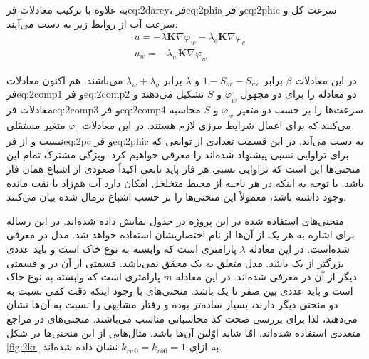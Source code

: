 به علاوه با ترکیب معادلات ‌فر{eq:2darcy}، ‌فر{eq:2phia} و ‌فر{eq:2phic} سرعت کل و سرعت آب از روابط زیر به دست می‌آیند:
\begin{align}
	\label{eq:2comp3}
&u = - \lambda\textbf{K}\nabla\varphi_w - \lambda_o\textbf{K}\nabla\varphi_c \\
	\label{eq:2comp4}
&u_w =- \lambda_w\textbf{K}\nabla\varphi_w 
\end{align}

در این معادلات $\beta$ برابر $1-S_{or}-S_{wc}$ و $\lambda$ برابر $\lambda_w +\lambda_o$ می‌باشند. هم اکنون معادلات ‌فر{eq:2comp1} و ‌فر{eq:2comp2} دو معادله را برای دو مجهول $\varphi_w$ و $S$ تشکیل می‌دهند و معادلات ‌فر{eq:2comp3} و ‌فر{eq:2comp4} سرعت‌ها را بر حسب دو متغیر $\varphi_w$ و $S$ محاسبه می‌کنند که برای اعمال شرایط مرزی لازم هستند. در این معادلات $\varphi_c$ متغیر مستقلی نیست و از ‌فر{eq:2pc} و ‌فر{eq:2phic} به دست می‌آید.
در این قسمت تعدادی از توابعی که برای تراوایی نسبی پیشنهاد شده‌اند را معرفی خواهیم کرد. ویژگی مشترک تمام این منحنی‌ها این است که تراوایی نسبی هر فاز باید تابعی اکیداً صعودی از اشباع همان فاز باشد. با توجه به اینکه در هر ناحیه از محیط متخلخل امکان دارد آب هم‌زاد یا نفت مانده وجود داشته باشد، معمولاً این منحنی‌ها را بر حسب اشباع نرمال شده بیان می‌کنند.

منحنی‌های استفاده شده در این پروژه در جدول  نمایش داده شده‌اند. در این رساله برای اشاره به هر یک از آن‌ها از نام اختصاریشان استفاده خواهد شد. مدل  در \cite{brooks} معرفی شده‌است. در این معادله $\lambda$ پارامتری است که وابسته به نوع خاک است و باید عددی بزرگتر از یک باشد. مدل  متعلق به یک محقق نمی‌باشد. قسمتی از آن در \cite{vang} و قسمتی دیگر از آن در \cite{parker} معرفی شده‌اند. در این معادله $m$ پارامتری است که وابسته به نوع خاک است و باید عددی بین صفر تا یک باشد. منحنی‌های  با وجود اینکه دقت کمی نسبت به دو منحنی دیگر دارند، بسیار ساده‌تر بوده و رفتار مشابهی را نسبت به آن‌ها نشان ‌می‌دهند، لذا برای بررسی صحت کد محاسباتی مناسب می‌باشند. منحنی‌های  در مراجع متعددی استفاده شده‌اند. امّا شاید اوّلین آن‌ها \cite{vandujnum} باشد. مثال‌هایی از این منحنی‌ها در شکل \ref{fig:2kr} به ازای 
 $k_{rw0}=k_{ro0}=1$ 
نشان داده شده‌اند.

